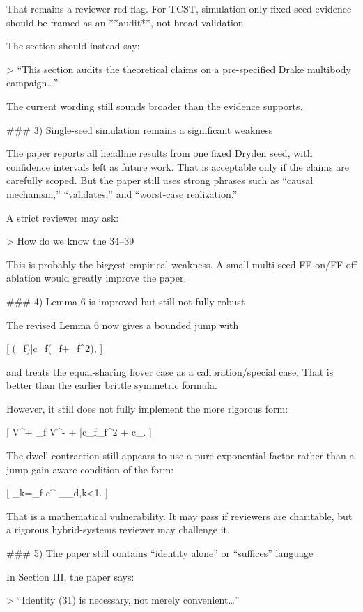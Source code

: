 That remains a reviewer red flag. For TCST, simulation-only fixed-seed evidence should be framed as an **audit**, not broad validation.

The section should instead say:

> “This section audits the theoretical claims on a pre-specified Drake multibody campaign…”

The current wording still sounds broader than the evidence supports.

### 3) Single-seed simulation remains a significant weakness

The paper reports all headline results from one fixed Dryden seed, with confidence intervals left as future work.  That is acceptable only if the claims are carefully scoped. But the paper still uses strong phrases such as “causal mechanism,” “validates,” and “worst-case realization.”

A strict reviewer may ask:

> How do we know the 34–39%

This is probably the biggest empirical weakness. A small multi-seed FF-on/FF-off ablation would greatly improve the paper.

### 4) Lemma 6 is improved but still not fully robust

The revised Lemma 6 now gives a bounded jump with

[
\chi(\Delta_f)\le \bar c_f(\Delta_f+\Delta_f^2),
]

and treats the equal-sharing hover case as a calibration/special case. That is better than the earlier brittle symmetric formula.

However, it still does not fully implement the more rigorous form:

[
V^+ \le \mu_f V^- + \bar c_f\Delta_f^2 + c_\eta.
]

The dwell contraction still appears to use a pure exponential factor rather than a jump-gain-aware condition of the form:

[
\rho_k=\mu_f e^{-\alpha_{\min}\tau_{d,k}}<1.
]

That is a mathematical vulnerability. It may pass if reviewers are charitable, but a rigorous hybrid-systems reviewer may challenge it.

### 5) The paper still contains “identity alone” or “suffices” language

In Section III, the paper says:

> “Identity (31) is necessary, not merely convenient…”

